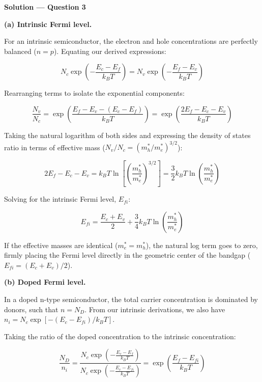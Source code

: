 \textbf{\large Solution --- Question 3}

\textbf{(a) Intrinsic Fermi level.}

For an intrinsic semiconductor, the electron and hole concentrations are perfectly balanced ($n = p$). Equating our derived expressions:

\begin{equation*}
  N_c \exp\left(-\frac{E_c - E_f}{k_B T}\right) = N_v \exp\left(-\frac{E_f - E_v}{k_B T}\right)
\end{equation*}

Rearranging terms to isolate the exponential components:

\begin{equation*}
  \frac{N_v}{N_c} = \exp\left(\frac{E_f - E_v - (E_c - E_f)}{k_B T}\right) = \exp\left(\frac{2E_f - E_c - E_v}{k_B T}\right)
\end{equation*}

Taking the natural logarithm of both sides and expressing the density of states ratio in terms of effective mass ($N_v / N_c = (m_h^* / m_e^*)^{3/2}$):

\begin{equation*}
  2E_f - E_c - E_v = k_B T \ln\left[ \left(\frac{m_h^*}{m_e^*}\right)^{3/2} \right] = \frac{3}{2} k_B T \ln\left(\frac{m_h^*}{m_e^*}\right)
\end{equation*}

Solving for the intrinsic Fermi level, $E_{fi}$:

\begin{equation*}
  \boxed{E_{fi} = \frac{E_c + E_v}{2} + \frac{3}{4} k_B T \ln\left(\frac{m_h^*}{m_e^*}\right)}
\end{equation*}

If the effective masses are identical ($m_e^* = m_h^*$), the natural log term goes to zero, firmly placing the Fermi level directly in the geometric center of the bandgap ($E_{fi} = (E_c + E_v)/2$).

\textbf{(b) Doped Fermi level.}

In a doped n-type semiconductor, the total carrier concentration is dominated by donors, such that $n = N_D$. From our intrinsic derivations, we also have $n_i = N_c \exp[-(E_c - E_{fi}) / k_B T]$.

Taking the ratio of the doped concentration to the intrinsic concentration:

\begin{equation*}
  \frac{N_D}{n_i} = \frac{N_c \exp\left(-\frac{E_c - E_f}{k_B T}\right)}{N_c \exp\left(-\frac{E_c - E_{fi}}{k_B T}\right)} = \exp\left(\frac{E_f - E_{fi}}{k_B T}\right)
\end{equation*}

